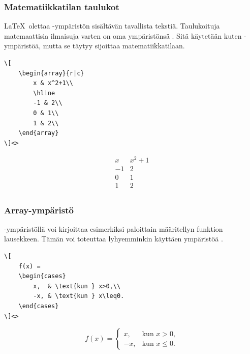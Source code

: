 \begin{fframe}
    \frametitle{Matematiikkatilan taulukot}
    \LaTeX\ olettaa -ympäristön sisältävän tavallista tekstiä. Taulukoituja matemaattisia ilmaisuja varten on oma ympäristönsä . Sitä käytetään kuten -ympäristöä, mutta se täytyy sijoittaa matematiikkatilaan.\vaihto
    \pause

    \begin{minipage}{5cm}
        \begin{lstlisting}
\[
    \begin{array}{r|c}
        x & x^2+1\\
        \hline
        -1 & 2\\
        0 & 1\\
        1 & 2\\
    \end{array}
\]<>
        \end{lstlisting}
    \end{minipage}
    \begin{minipage}{5cm}
        \[
        \begin{array}{r|c}
            x & x^2+1\\
            \hline
            -1 & 2\\
            0 & 1\\
            1 & 2\\
        \end{array}
        \]
    \end{minipage}
\end{fframe}

\begin{fframe}
    \frametitle{Array-ympäristö}
    -ympäristöllä voi kirjoittaa esimerkiksi paloittain määritellyn funktion lausekkeen. Tämän voi toteuttaa lyhyemminkin käyttäen ympäristöä . 
    \pause
    \begin{lstlisting}
\[
    f(x) =
    \begin{cases}
        x,  & \text{kun } x>0,\\
        -x, & \text{kun } x\leq0.
    \end{cases}
\]<>
    \end{lstlisting}
    \begin{sample}
        \[
            f(x) =
            \begin{cases}
                x,  & \text{kun } x>0,\\
                -x, & \text{kun } x\leq0.
            \end{cases}
        \]
    \end{sample}
\end{fframe}

